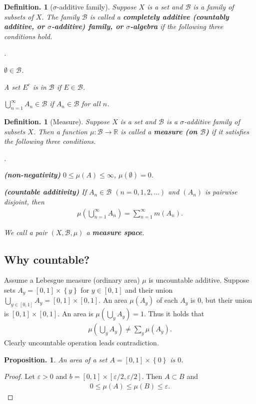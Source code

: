 \documentclass[openany, a4paper, oneside]{jsbook}
\newcounter{enum2}
\renewenvironment{enumerate}{%
\begin{list}%
{%
\arabic{enum2}.\ \,%
}%
{%
\usecounter{enum2}
\setlength{\itemindent}{0pt}%
\setlength{\leftmargin}{15pt}%
\setlength{\rightmargin}{0pt}%
\setlength{\labelsep}{0pt}%
\setlength{\labelwidth}{6pt}%
\setlength{\itemsep}{0pt}%
\setlength{\parsep}{0pt}%
\setlength{\listparindent}{0pt}%
}
}{%
\end{list}%
}
\theoremstyle{break}
\theoremstyle{breakdefn}
\newtheorem{prop}[thm]{Proposition.}
\newtheorem{defn}[thm]{Definition.}
\newcommand{\rbk}[1]{\left (#1\right)}
\newcommand{\sqbk}[1]{\left[#1\right]}
\newcommand{\cbk}[1]{\left\{#1\right\}}
\newcommand{\bbR}{\mathbb{R}}
\newcommand{\calB}{\mathcal{B}}
\newcommand{\upbf}[1]{\textup{\textbf{#1}}}
\begin{document}
\begin{defn}[$\sigma$-additive family]
 Suppose $X$ is a set and $\calB$ is a family of subsets of $X$.
 The family $\calB$ is called a \upbf{completely additive (countably additive, or $\sigma$-additive) family, or $\sigma$-algebra}
 if the following three conditions hold.
\begin{enumerate}
\item $\emptyset \in \calB$.
\item A set $E^{c}$ is in $\calB$ if $E \in \calB$.
\item $\bigcup_{n=1}^{\infty} A_n \in \calB$ if $A_n \in \calB$ for all $n$.
\end{enumerate}
\end{defn}
\begin{defn}[Measure]
 Suppose $X$ is a set and $\calB$ is a $\sigma$-additive family of subsets $X$.
 Then a function $\mu \colon \calB \to \bbR$ is called a \upbf{measure (on $\calB$)}
 if it satisfies the following three conditions.
\begin{enumerate}
\item \upbf{(non-negativity)} $0 \leq \mu (A) \leq \infty$, $\mu (\emptyset) = 0$.
\item \upbf{(countable additivity)} If $A_n \in \calB$ $(n = 0, 1, 2, \dots)$ and $(A_n)$ is pairwise disjoint, then
    \begin{align}
     \mu \rbk{\bigcup_{n=1}^{\infty} A_n} = \sum_{n=1}^{\infty} m (A_n).
    \end{align}
\end{enumerate}
 We call a pair $(X, \calB, \mu)$ a \upbf{measure space}.
\end{defn}
\subsection{Why countable?}


Assume a Lebesgue measure (ordinary area) $\mu$ is uncountable additive.
Suppose sets $A_y = \sqbk{0, 1} \times \cbk{y}$ for $y \in \sqbk{0, 1}$
and their union $\bigcup_{y \in \sqbk{0, 1}} A_y = \sqbk{0, 1} \times \sqbk{0, 1}$.
An area $\mu (A_y)$ of each $A_y$ is 0, but their union is $\sqbk{0, 1} \times \sqbk{0, 1}$.
An area is $\mu (\bigcup_y A_y) = 1$.
Thus it holds that
\begin{align}
 \mu \rbk{ \bigcup_y A_y}
 \neq
 \sum_y \mu (A_y).
\end{align}
Clearly uncountable operation leads contradiction.
\begin{prop}
 An area of a set $A = \sqbk{0, 1} \times \cbk{0}$ is $0$.
\end{prop}
\begin{proof}
Let $\varepsilon > 0$ and $b = \sqbk{0, 1} \times \sqbk{\varepsilon / 2, \varepsilon / 2}$.
Then $A \subset B$ and
\begin{align}
 0
 \leq
 \mu (A)
 \leq
 \mu (B)
 \leq
 \varepsilon.
\end{align}
\end{proof}
\end{document}
